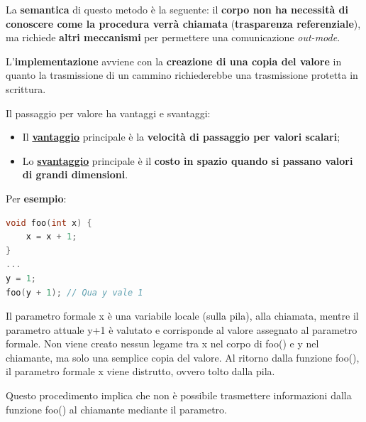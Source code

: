 \documentclass[a4paper]{article}
\begin{document}
	\noindent
	La \textbf{semantica} di questo metodo è la seguente: il \textbf{corpo non ha necessità di conoscere come la procedura verrà chiamata} (\textcolor{Red3}{\textbf{trasparenza referenziale}}), ma richiede \textbf{altri meccanismi} per permettere una comunicazione \emph{out-mode}.\newline
	
	\noindent
	L'\textbf{implementazione} avviene con la \textbf{creazione di una copia del valore} in quanto la trasmissione di un cammino richiederebbe una trasmissione protetta in scrittura.\newline
	
	\noindent
	Il passaggio per valore ha vantaggi e svantaggi:
	\begin{itemize}
		\item Il \textcolor{Green4}{\textbf{\underline{vantaggio}}} principale è la \textbf{velocità di passaggio per valori scalari};
		
		\item Lo \textcolor{Red3}{\textbf{\underline{svantaggio}}} principale è il \textbf{costo in spazio quando si passano valori di grandi dimensioni}.
	\end{itemize}
	Per \textcolor{Green4}{\textbf{esempio}}:
	\begin{lstlisting}[language=C]
void foo(int x) {
	x = x + 1;
}
...
y = 1;
foo(y + 1); // Qua y vale 1\end{lstlisting}
	Il parametro formale \textsf{x} è una variabile locale (sulla pila), alla chiamata, mentre il parametro attuale \textsf{y+1} è valutato e corrisponde al valore assegnato al parametro formale. Non viene creato nessun legame tra \textsf{x} nel corpo di \textsf{foo()} e \textsf{y} nel chiamante, ma solo una semplice copia del valore. Al ritorno dalla funzione \textsf{foo()}, il parametro formale \textsf{x} viene distrutto, ovvero tolto dalla pila.
	
	Questo procedimento implica che non è possibile trasmettere informazioni dalla funzione \textsf{foo()} al chiamante mediante il parametro.\newpage
	
\end{document}
